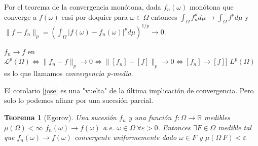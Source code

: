 \documentclass[11pt, a4paper]{article}
\newif\IfInSansMode
\theoremstyle{theorem-style}
\newtheorem{nth}{Teorema}[section]
\theoremstyle{definition-style}
\theoremstyle{remark-style}
\theoremstyle{example-style}
\begin{document}
Por el teorema de la convergencia monótona, dada $f_{n}(\omega)$ monótona que
converge a $f(\omega)$ casi por doquier para $\omega \in \Omega$ entonces
$\int_{\Omega}f_{n}^{p}d\mu \rightarrow \int_{\Omega}f^{p}d\mu$ y $\|f - f_{n}\|_{p}
= \left(\int_{\Omega}|f(\omega)-f_{n}(\omega)|^{p}d\mu\right)^{1/p} \rightarrow
0$.

$f_{n} \rightarrow f$ en $\mathcal L^{p}(\Omega) \Leftrightarrow \|f_{n}-f\|_{p}
\rightarrow 0 \Leftrightarrow \|[f_{n}]-[f]\|_{p} \rightarrow 0 \Leftrightarrow
{[f_{n}]} \rightarrow [f]]$ $L^{p}(\Omega)$ es lo que llamamos
\textit{convergencia p-media}. 

El corolario \ref{jose} es una "vuelta" de la última implicación de
convergencia. Pero solo lo podemos afinar por una sucesión parcial.

\begin{nth}[Egorov]
  Una sucesión  $f_{n}$ y una función $f:\Omega \rightarrow \mathbb R $ medibles
  $\mu(\Omega) < \infty $ ${f_{n}(\omega)} \rightarrow f(\omega)$ a.e. $ \omega \in \Omega \
  \forall \varepsilon > 0$. Entonces $ \exists F \in \Omega $ medible tal que
  ${f_{n}(\omega)} \rightarrow f(\omega)$ convergente uniformemente dado $\omega
  \in F$ y $\mu(\Omega \ F) < \varepsilon$
\end{nth}
\end{document}
